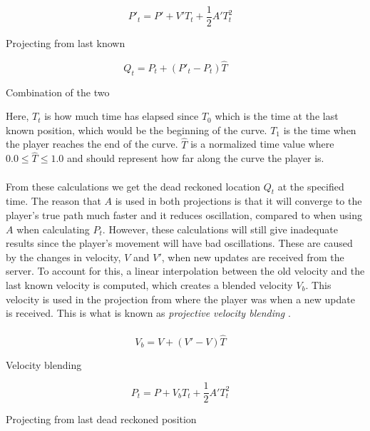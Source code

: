 \begin{displaymath}
    P'_t = P' + V'T_t + \frac{1}{2}A'T_t^2 \quad
\end{displaymath}
\begin{center}
    Projecting from last known
\end{center}

\begin{displaymath}
    Q_t = P_t + (P'_t - P_t)\hat{T} \qquad
\end{displaymath}
\begin{center}
    Combination of the two
\end{center}
Here, $T_t$ is how much time has elapsed since $T_0$ which is the time at the last known position, which would be the beginning of the curve.
$T_1$ is the time when the player reaches the end of the curve.
$\hat{T}$ is a normalized time value where $0.0\le\hat{T}\le1.0$ and should represent how far along the curve the player is.
\\\\
From these calculations we get the dead reckoned location $ Q_t $ at the specified time.
The reason that $ A $ is used in both projections is that it will converge to the player's true path much faster and it reduces oscillation, compared to when using $ A $ when calculating $ P_t $.
However, these calculations will still give inadequate results since the player's movement will have bad oscillations.
These are caused by the changes in velocity, $V$ and $V'$, when new updates are received from the server.
To account for this, a linear interpolation between the old velocity and the last known velocity is computed, which creates a blended velocity $V_b$.
This velocity is used in the projection from where the player was when a new update is received.
This is what is known as \textit{projective velocity blending} \cite{deadreckoning}.
\\\\
\begin{displaymath}
    V_b = V + (V' - V)\hat{T} \quad
\end{displaymath}
\begin{center}
    Velocity blending
\end{center}
\begin{displaymath}
    P_t = P + V_bT_t + \frac{1}{2}A'T_t^2 \quad
\end{displaymath}
\begin{center}
    Projecting from last dead reckoned position
\end{center}

